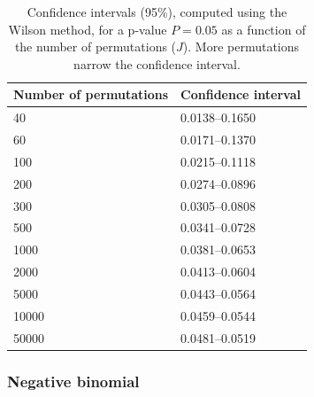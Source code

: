 \begin{table}[!tbp]
\caption{Confidence intervals (95\%), computed using the Wilson method, for a p-value $P=0.05$ as a function of the number of permutations ($J$). More permutations narrow the confidence interval.}
\begin{center}
\begin{tabular}{@{}m{25mm}<{\raggedright}m{25mm}<{\raggedright}@{}}
\toprule
Number of permutations & Confidence interval\\
\midrule
40 & 0.0138--0.1650\\
60 & 0.0171--0.1370\\
100 & 0.0215--0.1118\\
200 & 0.0274--0.0896\\
300 & 0.0305--0.0808\\
500 & 0.0341--0.0728\\
1000 & 0.0381--0.0653\\
2000 & 0.0413--0.0604\\
5000 & 0.0443--0.0564\\
10000 & 0.0459--0.0544\\
50000 & 0.0481--0.0519\\
\bottomrule
\end{tabular}
\end{center}
\label{tab:fewpermCI}
\end{table}

\subsubsection{Negative binomial}

